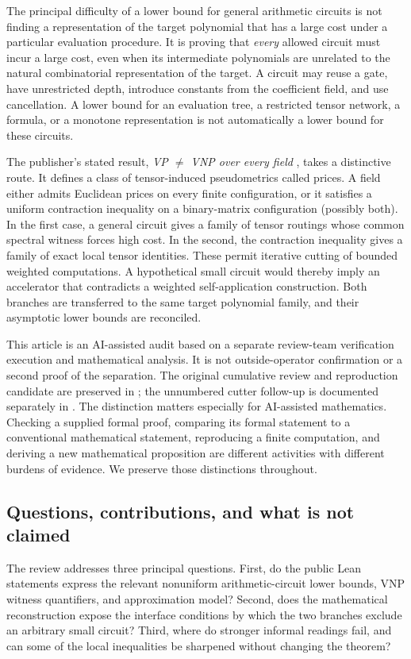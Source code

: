 \documentclass[11pt,letterpaper]{article}
\theoremstyle{definition}\newtheorem{definition}[theorem]{Definition}\newtheorem{example}[theorem]{Example}
\theoremstyle{remark}\newtheorem{remark}[theorem]{Remark}
\begin{document}
The principal difficulty of a lower bound for general arithmetic circuits is not finding a representation of the target polynomial that has a large cost under a particular evaluation procedure. It is proving that \emph{every} allowed circuit must incur a large cost, even when its intermediate polynomials are unrelated to the natural combinatorial representation of the target. A circuit may reuse a gate, have unrestricted depth, introduce constants from the coefficient field, and use cancellation. A lower bound for an evaluation tree, a restricted tensor network, a formula, or a monotone representation is not automatically a lower bound for these circuits.

The publisher's stated result, \emph{VP $\ne$ VNP over every field} \cite{claude}, takes a distinctive route. It defines a class of tensor-induced pseudometrics called prices. A field either admits Euclidean prices on every finite configuration, or it satisfies a uniform contraction inequality on a binary-matrix configuration (possibly both). In the first case, a general circuit gives a family of tensor routings whose common spectral witness forces high cost. In the second, the contraction inequality gives a family of exact local tensor identities. These permit iterative cutting of bounded weighted computations. A hypothetical small circuit would thereby imply an accelerator that contradicts a weighted self-application construction. Both branches are transferred to the same target polynomial family, and their asymptotic lower bounds are reconciled.

This article is an AI-assisted audit based on a separate review-team verification execution and mathematical analysis. It is not outside-operator confirmation or a second proof of the separation. The original cumulative review and reproduction candidate are preserved in \cite{review,repro}; the unnumbered cutter follow-up is documented separately in \cite{j4}. The distinction matters especially for AI-assisted mathematics. Checking a supplied formal proof, comparing its formal statement to a conventional mathematical statement, reproducing a finite computation, and deriving a new mathematical proposition are different activities with different burdens of evidence. We preserve those distinctions throughout.

\subsection{Questions, contributions, and what is not claimed}
The review addresses three principal questions. First, do the public Lean statements express the relevant nonuniform arithmetic-circuit lower bounds, VNP witness quantifiers, and approximation model? Second, does the mathematical reconstruction expose the interface conditions by which the two branches exclude an arbitrary small circuit? Third, where do stronger informal readings fail, and can some of the local inequalities be sharpened without changing the theorem?
\end{document}
